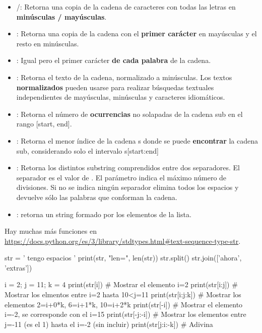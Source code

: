 \begin{itemize}

\item {}/:
Retorna una copia de la cadena de caracteres con todas las letras en \textbf{minúsculas / mayúsculas}.

\item {}:
Retorna una copia de la cadena con el \textbf{primer carácter} en mayúsculas y el resto en minúsculas.

\item {}: Igual pero el primer carácter \textbf{de cada palabra} de la cadena.

\item {}:
Retorna el texto de la cadena, normalizado a minúsculas. Los textos  \textbf{normalizados} pueden usarse para realizar búsquedas textuales independientes de mayúsculas, minúsculas y caracteres idiomáticos.


\item {}:
Retorna el número de \textbf{ocurrencias} no solapadas de la cadena sub en el rango [start, end].

\item {}:
Retorna el menor índice de la cadena s donde se puede \textbf{encontrar} la cadena sub, considerando solo el intervalo s[start:end]

\item {}:
Retorna los distintos substring  comprendidos entre dos separadores.
El separador es el valor de .  El parámetro  indica el máximo número de divisiones.
Si no se indica ningún separador elimina todos los espacios y devuelve sólo las palabras que conforman la cadena.

\item {}: retorna un string formado por los elementos de la lista.
\end{itemize}

Hay muchas más funciones en \url{https://docs.python.org/es/3/library/stdtypes.html#text-sequence-type-str}.


\begin{example}{}
\begin{pyconsole}[][frame=single]

str = ' tengo espacios '
print(str, "len=", len(str))
str.split()
str.join(['ahora', 'extras'])

i = 2; j = 11; k = 4
print(str[i])  # Mostrar el elemento i=2
print(str[i:j]) # Mostrar los elmentos entre i=2 hasta 10<j=11
print(str[i:j:k]) # Mostrar los elementos 2=i+0*k, 6=i+1*k, 10=i+2*k
print(str[-i])  # Mostrar el elemento i=-2, se corresponde con el i=15
print(str[-j:-i]) # Mostrar los elementos entre j=-11 (es el 1) hasta el i=-2 (sin incluir)
print(str[j:i:-k]) # Adivina
\end{pyconsole}
\end{example}



